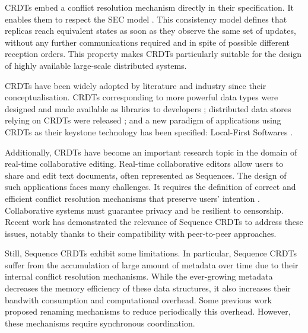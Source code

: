 \documentclass[10pt,journal,compsoc]{IEEEtran}
\begin{document}
\acp{CRDT} embed a conflict resolution mechanism directly in their specification.
It enables them to respect the \ac{SEC} model \cite{shapiro_2011_crdt}.
This consistency model defines that replicas reach equivalent states as soon as they observe the same set of updates, without any further communications required and in spite of possible different reception orders.
This property makes \acp{CRDT} particularly suitable for the design of highly available large-scale distributed systems.

\acp{CRDT} have been widely adopted by literature and industry since their conceptualisation.
\acp{CRDT} corresponding to more powerful data types were designed and made available as libraries to developers \cite{Nicolaescu2016YATA,yjsimplem, jsoncrdt2017, automerge};
distributed data stores relying on \acp{CRDT} were released \cite{RiakKV, AntidoteDB, Anna2021, Concordant};
and a new paradigm of applications using \acp{CRDT} as their keystone technology has been specified: Local-First Softwares \cite{localfirstsoftware2019, pushpin2020}.

Additionally, \acp{CRDT} have become an important research topic in the domain of real-time collaborative editing.
Real-time collaborative editors allow users to share and edit text documents, often represented as Sequences.
The design of such applications faces many challenges.
It requires the definition of correct and efficient conflict resolution mechanisms that preserve users' intention \cite{10.1145/289444.289469}.
Collaborative systems must guarantee privacy and be resilient to censorship.
Recent work \cite{ahmednacer:inria-00629503, Nedelec2016CRATE, MUTE2017} has demonstrated the relevance of Sequence \acp{CRDT} to address these issues, notably thanks to their compatibility with peer-to-peer approaches.

Still, Sequence \acp{CRDT} exhibit some limitations.
In particular, Sequence \acp{CRDT} suffer from the accumulation of large amount of metadata over time due to their internal conflict resolution mechanisms.
While the ever-growing metadata decreases the memory efficiency of these data structures, it also increases their bandwith consumption and computational overhead.
Some previous work proposed renaming mechanisms \cite{letia:hal-01248270,zawirski:hal-01248197} to reduce periodically this overhead.
However, these mechanisms require synchronous coordination.
\end{document}
